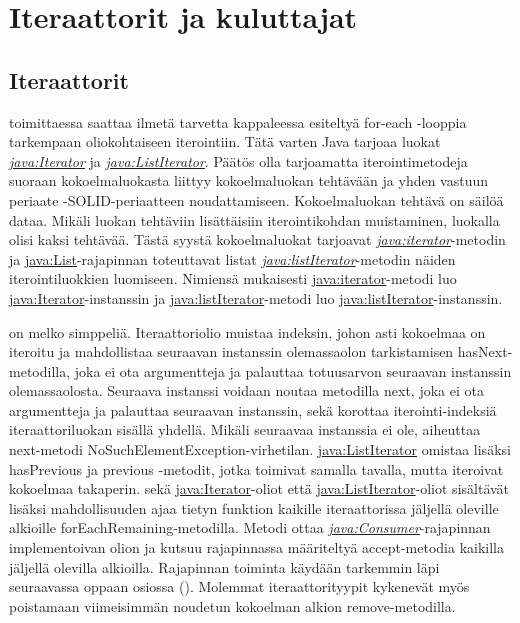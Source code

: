 \documentclass{tufte-book}
\newcommand{\java}[1]{\underline{\gls{java:#1}}}
\newcommand{\newjava}[1]{\textit{\java{#1}}}
\begin{document}
\section{Iteraattorit ja kuluttajat}
\label{iterators+consumers}

\subsection{Iteraattorit}
\label{iterators}

 toimittaessa saattaa ilmetä tarvetta kappaleessa 
esiteltyä for-each -looppia tarkempaan oliokohtaiseen iterointiin. Tätä varten Java tarjoaa luokat
\newjava{Iterator} ja \newjava{ListIterator}. Päätös olla tarjoamatta iterointimetodeja suoraan
kokoelmaluokasta liittyy kokoelmaluokan tehtävään ja \gls{yhden vastuun periaate}
-SOLID-periaatteen noudattamiseen. Kokoelmaluokan tehtävä on säilöä dataa. Mikäli luokan
tehtäviin lisättäisiin iterointikohdan muistaminen, luokalla olisi kaksi tehtävää. Tästä syystä
kokoelmaluokat tarjoavat \newjava{iterator}-metodin ja \java{List}-rajapinnan toteuttavat listat
\newjava{listIterator}-metodin näiden iterointiluokkien luomiseen. Nimiensä mukaisesti
\java{iterator}-metodi luo \java{Iterator}-instanssin ja \java{listIterator}-metodi luo
\java{listIterator}-instanssin.

 on melko simppeliä. Iteraattoriolio muistaa indeksin, johon
asti kokoelmaa on iteroitu ja mahdollistaa seuraavan instanssin olemassaolon tarkistamisen
hasNext-metodilla, joka ei ota argumentteja ja palauttaa totuusarvon seuraavan instanssin
olemassaolosta. Seuraava instanssi voidaan noutaa metodilla next, joka ei ota argumentteja ja
palauttaa seuraavan instanssin, sekä korottaa iterointi-indeksiä iteraattoriluokan sisällä
yhdellä. Mikäli seuraavaa instanssia ei ole, aiheuttaa next-metodi
NoSuchElementException-virhetilan. \java{ListIterator} omistaa lisäksi hasPrevious ja previous
-metodit, jotka toimivat samalla tavalla, mutta iteroivat kokoelmaa takaperin. sekä
\java{Iterator}-oliot että \java{ListIterator}-oliot sisältävät lisäksi mahdollisuuden ajaa
tietyn funktion kaikille iteraattorissa jäljellä oleville alkioille forEachRemaining-metodilla.
Metodi ottaa \newjava{Consumer}-rajapinnan implementoivan olion ja kutsuu rajapinnassa
määriteltyä accept-metodia kaikilla jäljellä olevilla alkioilla. Rajapinnan toiminta käydään
tarkemmin läpi seuraavassa oppaan osiossa (). Molemmat iteraattorityypit
kykenevät myös poistamaan viimeisimmän noudetun kokoelman alkion remove-metodilla.
\end{document}
